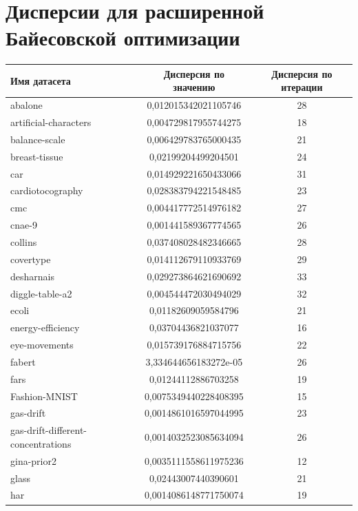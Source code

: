 \documentclass[times,specification,annotation]{itmo-student-thesis}
\begin{document}
\chapter{Дисперсии для расширенной Байесовской оптимизации}\label{app:pbo-disp}
\begin{center} 
	\begin{longtable}{ |m{5cm}|c|c| } 
		\hline
		\textbf{Имя датасета} & \textbf{Дисперсия по значению} & \textbf{Дисперсия по итерации} \\
		\hline\hline
		abalone & 0,012015342021105746 & 28 \\
		\hline
		artificial-characters & 0,004729817955744275 & 18 \\
		\hline
		balance-scale & 0,006429783765000435 & 21 \\
		\hline
		breast-tissue & 0,02199204499204501 & 24 \\
		\hline
		car & 0,014929221650433066 & 31 \\
		\hline
		cardiotocography & 0,028383794221548485 & 23 \\
		\hline
		cmc & 0,004417772514976182 & 27 \\
		\hline
		cnae-9 & 0,001441589367774565 & 26 \\
		\hline
		collins & 0,037408028482346665 & 28 \\
		\hline
		covertype & 0,014112679110933769 & 29 \\
		\hline
		desharnais & 0,029273864621690692 & 33 \\
		\hline
		diggle-table-a2 & 0,004544472030494029 & 32 \\
		\hline
		ecoli & 0,01182609059584796 & 21 \\
		\hline
		energy-efficiency & 0,03704436821037077 & 16 \\
		\hline
		eye-movements & 0,015739176884715756 & 22 \\
		\hline
		fabert & 3,334644656183272e-05 & 26 \\
		\hline
		fars & 0,01244112886703258 & 19 \\
		\hline
		Fashion-MNIST & 0,0075349440228408395 & 15 \\
		\hline
		gas-drift & 0,0014861016597044995 & 23 \\
		\hline
		gas-drift-different-concentrations & 0,0014032523085634094 & 26 \\
		\hline
		gina-prior2 & 0,0035111558611975236 & 12 \\
		\hline
		glass & 0,02443007440390601 & 21 \\
		\hline
		har & 0,0014086148771750074 & 19 \\

\end{longtable}
\end{center}
\end{document}
